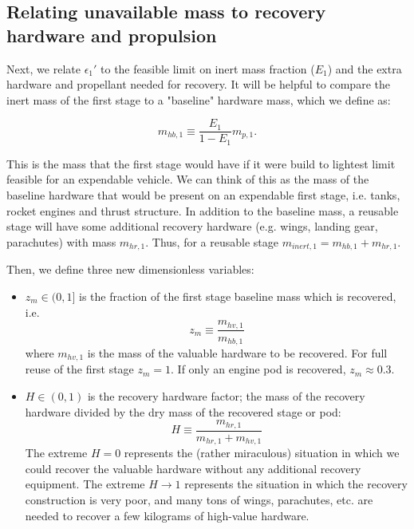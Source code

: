 \documentclass[conf]{new-aiaa}
\begin{document}
\begin{multicols}{2}
\subsection{Relating unavailable mass to recovery hardware and propulsion}
Next, we relate $\epsilon_1'$ to the feasible limit on inert mass fraction ($E_1$) and the extra hardware and propellant needed for recovery.
It will be helpful to compare the inert mass of the first stage to a "baseline" hardware mass, which we define as:

\begin{equation}
m_{hb,1} \equiv \frac{E_1}{1 - E_1} m_{p,1}.
\end{equation}

This is the mass that the first stage would have if it were build to lightest limit feasible for an expendable vehicle. We can think of this as the mass of the baseline hardware that would be present on an expendable first stage, i.e. tanks, rocket engines and thrust structure. In addition to the baseline mass, a reusable stage will have some additional recovery hardware (e.g. wings, landing gear, parachutes) with mass $m_{hr,1}$. Thus, for a reusable stage $m_{inert,1} = m_{hb,1} + m_{hr,1}$.

Then, we define three new dimensionless variables:
\begin{itemize}
    \item $z_m \in (0, 1]$ is the fraction of the first stage baseline mass which is recovered, i.e.
    \begin{equation}
    z_m \equiv \frac{m_{hv,1}}{m_{hb,1}}
    \end{equation}
    where $m_{hv,1}$ is the mass of the valuable hardware to be recovered. For full reuse of the first stage $z_m = 1$. If only an engine pod is recovered, $z_m \approx 0.3$.

    \item $H \in (0, 1)$ is the recovery hardware factor; the mass of the recovery hardware divided by the dry mass of the recovered stage or pod:
    \begin{equation}
    H \equiv \frac{m_{hr,1}}{m_{hr,1} + m_{hv,1}}
    \end{equation}
    The extreme $H=0$ represents the (rather miraculous) situation in which we could recover the valuable hardware without any additional recovery equipment. The extreme $H \rightarrow 1$ represents the situation in which the recovery construction is very poor, and many tons of wings, parachutes, etc. are needed to recover a few kilograms of high-value hardware.


\end{itemize}
\end{multicols}
\end{document}
